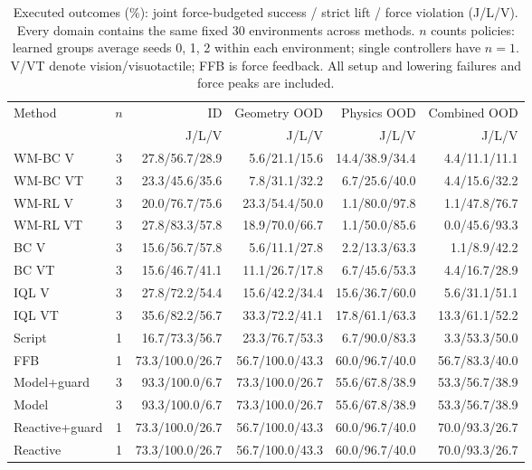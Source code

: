 \begin{table}[t]
\vspace*{5pt}
\centering
\caption{Executed outcomes (\%): joint force-budgeted success / strict lift / force violation (J/L/V). Every domain contains the same fixed 30 environments across methods. $n$ counts policies: learned groups average seeds 0, 1, 2 within each environment; single controllers have $n=1$. V/VT denote vision/visuotactile; FFB is force feedback. All setup and lowering failures and force peaks are included.}
\label{tab:control}
\begingroup
\fontsize{8}{9.2}\selectfont
\setlength{\tabcolsep}{2pt}
\renewcommand{\arraystretch}{1.10}
\begin{tabular*}{\textwidth}{@{\extracolsep{\fill}}lcrrrr@{}}
\toprule
Method & $n$ & ID & Geometry OOD & Physics OOD & Combined OOD \\
 & & J/L/V & J/L/V & J/L/V & J/L/V \\
\midrule
WM-BC V & 3 & 27.8/56.7/28.9 & 5.6/21.1/15.6 & 14.4/38.9/34.4 & 4.4/11.1/11.1 \\
WM-BC VT & 3 & 23.3/45.6/35.6 & 7.8/31.1/32.2 & 6.7/25.6/40.0 & 4.4/15.6/32.2 \\
WM-RL V & 3 & 20.0/76.7/75.6 & 23.3/54.4/50.0 & 1.1/80.0/97.8 & 1.1/47.8/76.7 \\
WM-RL VT & 3 & 27.8/83.3/57.8 & 18.9/70.0/66.7 & 1.1/50.0/85.6 & 0.0/45.6/93.3 \\
\addlinespace[2pt]
BC V & 3 & 15.6/56.7/57.8 & 5.6/11.1/27.8 & 2.2/13.3/63.3 & 1.1/8.9/42.2 \\
BC VT & 3 & 15.6/46.7/41.1 & 11.1/26.7/17.8 & 6.7/45.6/53.3 & 4.4/16.7/28.9 \\
IQL V & 3 & 27.8/72.2/54.4 & 15.6/42.2/34.4 & 15.6/36.7/60.0 & 5.6/31.1/51.1 \\
IQL VT & 3 & 35.6/82.2/56.7 & 33.3/72.2/41.1 & 17.8/61.1/63.3 & 13.3/61.1/52.2 \\
\addlinespace[2pt]
Script & 1 & 16.7/73.3/56.7 & 23.3/76.7/53.3 & 6.7/90.0/83.3 & 3.3/53.3/50.0 \\
FFB & 1 & 73.3/100.0/26.7 & 56.7/100.0/43.3 & 60.0/96.7/40.0 & 56.7/83.3/40.0 \\
\addlinespace[2pt]
Model+guard & 3 & 93.3/100.0/6.7 & 73.3/100.0/26.7 & 55.6/67.8/38.9 & 53.3/56.7/38.9 \\
Model & 3 & 93.3/100.0/6.7 & 73.3/100.0/26.7 & 55.6/67.8/38.9 & 53.3/56.7/38.9 \\
Reactive+guard & 1 & 73.3/100.0/26.7 & 56.7/100.0/43.3 & 60.0/96.7/40.0 & 70.0/93.3/26.7 \\
Reactive & 1 & 73.3/100.0/26.7 & 56.7/100.0/43.3 & 60.0/96.7/40.0 & 70.0/93.3/26.7 \\
\bottomrule
\end{tabular*}
\endgroup
\end{table}

